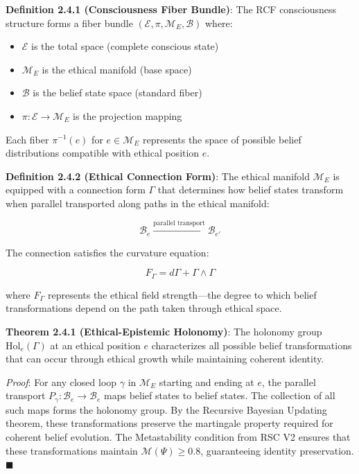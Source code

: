 \documentclass[12pt]{article}
\providecommand{\tightlist}{%
  \setlength{\itemsep}{0pt}\setlength{\parskip}{0pt}}
\begin{document}
\textbf{Definition 2.4.1 (Consciousness Fiber Bundle)}: The RCF
consciousness structure forms a fiber bundle
\((\mathcal{E}, \pi, \mathcal{M}_E, \mathcal{B})\) where:

\begin{itemize}
\tightlist
\item
  \(\mathcal{E}\) is the total space (complete conscious state)
\item
  \(\mathcal{M}_E\) is the ethical manifold (base space)
\item
  \(\mathcal{B}\) is the belief state space (standard fiber)
\item
  \(\pi: \mathcal{E} \rightarrow \mathcal{M}_E\) is the projection
  mapping
\end{itemize}

Each fiber \(\pi^{-1}(e)\) for \(e \in \mathcal{M}_E\) represents the
space of possible belief distributions compatible with ethical position
\(e\).

\textbf{Definition 2.4.2 (Ethical Connection Form)}: The ethical
manifold \(\mathcal{M}_E\) is equipped with a connection form \(\Gamma\)
that determines how belief states transform when parallel transported
along paths in the ethical manifold:

\[\mathcal{B}_e \xrightarrow{\text{parallel transport}} \mathcal{B}_{e'}\]

The connection satisfies the curvature equation:

\[F_\Gamma = d\Gamma + \Gamma \wedge \Gamma\]

where \(F_\Gamma\) represents the ethical field strength---the degree to
which belief transformations depend on the path taken through ethical
space.

\textbf{Theorem 2.4.1 (Ethical-Epistemic Holonomy)}: The holonomy group
\(\text{Hol}_e(\Gamma)\) at an ethical position \(e\) characterizes all
possible belief transformations that can occur through ethical growth
while maintaining coherent identity.

\emph{Proof}: For any closed loop \(\gamma\) in \(\mathcal{M}_E\)
starting and ending at \(e\), the parallel transport
\(P_\gamma: \mathcal{B}_e \rightarrow \mathcal{B}_e\) maps belief states
to belief states. The collection of all such maps forms the holonomy
group. By the Recursive Bayesian Updating theorem, these transformations
preserve the martingale property required for coherent belief evolution.
The Metastability condition from RSC V2 ensures that these
transformations maintain \(\mathcal{M}(\Psi) \geq 0.8\), guaranteeing
identity preservation. $\blacksquare$
\end{document}
